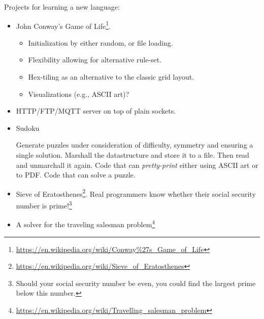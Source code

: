 Projects for learning a new language:
\begin{itemize}
  \item John Conway's Game of Life\footnote{\url{https://en.wikipedia.org/wiki/Conway\%27s_Game_of_Life}}\cite{Gardener1970MathematicalGT}.
    \begin{itemize}
      \item Initialization by either random, or file loading.
      \item Flexibility allowing for alternative rule-set.
      \item Hex-tiling as an alternative to the classic grid layout.
      \item Visualizations (e.g., ASCII art)?
    \end{itemize}
  \item HTTP/FTP/MQTT server on top of plain sockets.
  \item Sudoku
    \begin{itemize}
       Generate puzzles under consideration of difficulty, symmetry and ensuring a single solution.
       Marshall the datastructure and store it to a file. Then read and unmarchall it again.
       Code that can \textsl{pretty-print} either using ASCII art or to PDF.
       Code that can solve a puzzle.
    \end{itemize}
  \item Sieve of Eratosthenes\footnote{\url{https://en.wikipedia.org/wiki/Sieve_of_Eratosthenes}}. Real programmers know whether their social security number is prime!\footnote{Should your social security number be even, you could find the largest prime below this number.}
  \item A solver for the traveling salesman problem\footnote{\url{https://en.wikipedia.org/wiki/Travelling_salesman_problem}}
\end{itemize}











